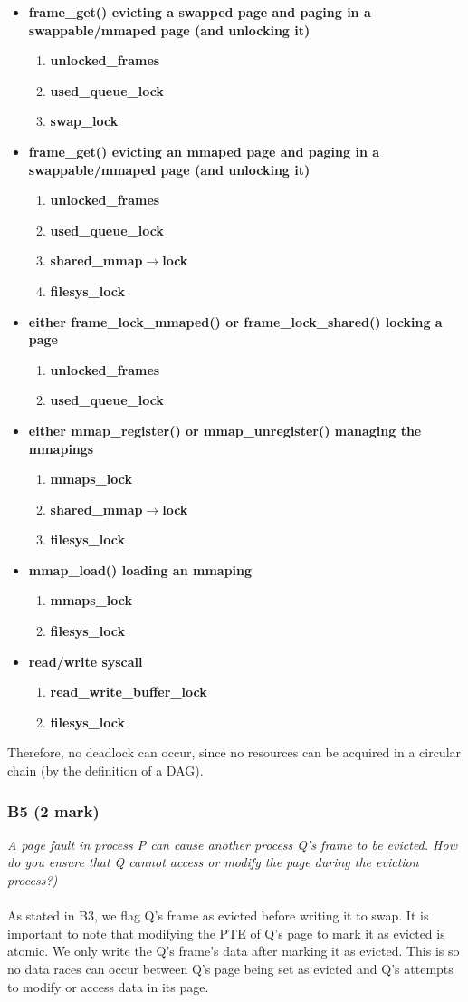 \documentclass{report}
\newcommand{\question}[1]{\textit{#1} \ }
\newcommand{\bullpara}[2]{\item \textbf{#1} \ #2}
\newcommand{\fun}[1]{\textcolor{Emerald}{\textbf{#1}}}
\newcommand{\var}[1]{\textcolor{RoyalPurple}{\textbf{#1}}}
\newcommand{\compitem}[1]{\begin{itemize}\setlength\itemsep{-0.1em}#1\end{itemize}}
\newcommand{\compenum}[1]{\begin{enumerate}\setlength\itemsep{-0.1em}#1\end{enumerate}}
\begin{document}
				\compitem{
					\bullpara{\fun{frame\_get()} evicting a swapped page and paging in a swappable/mmaped page (and unlocking it)}{
						\compenum{
							\item \var{unlocked\_frames}
							\item \var{used\_queue\_lock}
							\item \var{swap\_lock}
						}
					}
					\bullpara{\fun{frame\_get()} evicting an mmaped page and paging in a swappable/mmaped page (and unlocking it)}{
						\compenum{
							\item \var{unlocked\_frames}
							\item \var{used\_queue\_lock}
							\item \var{shared\_mmap$\to$lock}
							\item \var{filesys\_lock}
						}
					}
					\bullpara{either \fun{frame\_lock\_mmaped()} or \fun{frame\_lock\_shared()} locking a page}{
						\compenum{
							\item \var{unlocked\_frames}
							\item \var{used\_queue\_lock}
						}
					}
					\bullpara{either \fun{mmap\_register()} or \fun{mmap\_unregister()} managing the mmapings}{
						\compenum{
							\item \var{mmaps\_lock}
							\item \var{shared\_mmap$\to$lock}
							\item \var{filesys\_lock}
						}
					}
					\bullpara{\fun{mmap\_load()} loading an mmaping}{
						\compenum{
							\item \var{mmaps\_lock}
							\item \var{filesys\_lock}
						}
					}
					\bullpara{\fun{read}/\fun{write} syscall}{
						\compenum{
							\item \var{read\_write\_buffer\_lock}
							\item \var{filesys\_lock}
						}
					}
				}
				Therefore, no deadlock can occur, since no resources can be acquired in a circular chain (by the definition of a DAG).
				
			\subsubsection*{B5 (2 mark)}
				\question{A page fault in process P can cause another process Q's frame to
				be evicted. How do you ensure that Q cannot access or modify the page 
				during the eviction process?)}
				\\
				\\As stated in B3, we flag Q's frame as evicted before writing 
				it to swap. It is important to note that modifying the PTE of 
				Q's page to mark it as evicted is atomic. We only write the Q's
				frame's data after marking it as evicted. This is so no data 
				races can occur between Q's page being set as evicted and Q's 
				attempts to modify or access data in its page.
				
\end{document}
